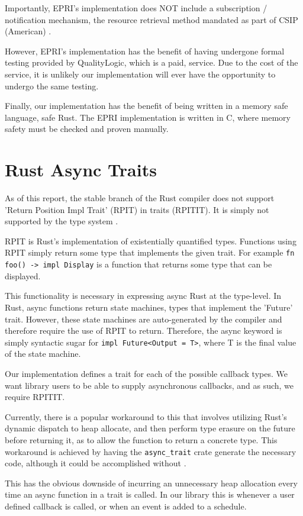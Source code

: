 Importantly, EPRI's implementation does NOT include a subscription / notification mechanism, the resource retrieval method mandated as part of CSIP (American) \cite{20305workshop}. 

However, EPRI's implementation has the benefit of having undergone formal testing provided by QualityLogic, which is a paid, service. Due to the cost of the service, it is unlikely our implementation will ever have the opportunity to undergo the same testing.

Finally, our implementation has the benefit of being written in a memory safe language, safe Rust. The EPRI implementation is written in C, where memory safety must be checked and proven manually. 

\section{Rust Async Traits}
As of this report, the stable branch of the Rust compiler does not support 'Return Position Impl Trait' (RPIT) in traits (RPITIT). It is simply not supported by the type system \cite{rustRPITIT}.

RPIT is Rust's implementation of existentially quantified types. Functions using RPIT simply return some type that implements the given trait. For example \texttt{fn foo() -> impl Display} is a function that returns some type that can be displayed.

This functionality is necessary in expressing async Rust at the type-level. In Rust, async functions return state machines, types that implement the 'Future' trait. However, these state machines are auto-generated by the compiler and therefore require the use of RPIT to return. Therefore, the async keyword is simply syntactic sugar for \texttt{impl Future<Output = T>}, where T is the final value of the state machine.

Our implementation defines a trait for each of the possible callback types. We want library users to be able to supply asynchronous callbacks, and as such, we require RPITIT.

Currently, there is a popular workaround to this that involves utilizing Rust's dynamic dispatch to heap allocate, and then perform type erasure on the future before returning it, as to allow the function to return a concrete type. This workaround is achieved by having the \texttt{async\_trait} crate generate the necessary code, although it could be accomplished without \cite{asynctrait}. 

This has the obvious downside of incurring an unnecessary heap allocation every time an async function in a trait is called. In our library this is whenever a user defined callback is called, or when an event is added to a schedule.

